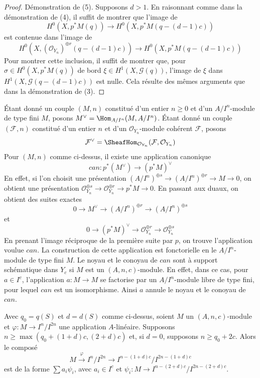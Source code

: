 \begin{proof}
\medskip\noindent
Démonstration de (5). Supposons $d > 1$. En raisonnant comme dans la démonstration de (4), il suffit de montrer que l'image de
$$
H^0(X, p^*M(q))
\longrightarrow
H^0(X, p^*M(q - (d - 1)c))
$$
est contenue dans l'image de
$$
H^0(X, (\mathcal{O}_{Y_n})^{\oplus r}(q - (d - 1)c))
\longrightarrow
H^0(X, p^*M(q - (d - 1)c))
$$
Pour montrer cette inclusion, il suffit de montrer que, pour $\sigma \in H^0(X, p^*M(q))$ de bord $\xi \in H^1(X, \mathcal{G}(q))$, l'image de $\xi$ dans $H^1(X, \mathcal{G}(q - (d - 1)c))$ est nulle. Cela résulte des mêmes arguments que dans la démonstration de (3).
\end{proof}

\begin{remark}
\label{remark-duals}
Étant donné un couple $(M, n)$ constitué d'un entier $n \geq 0$ et d'un $A/I^n$-module de type fini $M$, posons $M^\vee = \Hom_{A/I^n}(M, A/I^n)$. Étant donné un couple $(\mathcal{F}, n)$ constitué d'un entier $n$ et d'un $\mathcal{O}_{Y_n}$-module cohérent $\mathcal{F}$, posons
$$
\mathcal{F}^\vee =
\SheafHom_{\mathcal{O}_{Y_n}}(\mathcal{F}, \mathcal{O}_{Y_n})
$$
Pour $(M, n)$ comme ci-dessus, il existe une application canonique
$$
can : p^*(M^\vee) \longrightarrow (p^*M)^\vee
$$
En effet, si l'on choisit une présentation $(A/I^n)^{\oplus s} \to (A/I^n)^{\oplus r} \to M \to 0$, on obtient une présentation $\mathcal{O}_{Y_n}^{\oplus s} \to \mathcal{O}_{Y_n}^{\oplus r} \to
p^*M \to 0$. En passant aux duaux, on obtient des suites exactes
$$
0 \to M^\vee \to (A/I^n)^{\oplus r} \to (A/I^n)^{\oplus s}
$$
et
$$
0 \to (p^*M)^\vee \to
\mathcal{O}_{Y_n}^{\oplus r} \to
\mathcal{O}_{Y_n}^{\oplus s}
$$
En prenant l'image réciproque de la première suite par $p$, on trouve l'application voulue $can$. La construction de cette application est fonctorielle en le $A/I^n$-module de type fini $M$. Le noyau et le conoyau de $can$ sont à support schématique dans $Y_c$ si $M$ est un $(A, n, c)$-module. En effet, dans ce cas, pour $a \in I^c$, l'application $a : M \to M$ se factorise par un $A/I^n$-module libre de type fini, pour lequel $can$ est un isomorphisme. Ainsi $a$ annule le noyau et le conoyau de $can$.
\end{remark}

\begin{lemma}
\label{lemma-factor-hom}
Avec $q_0 = q(S)$ et $d = d(S)$ comme ci-dessus, soient $M$ un $(A, n, c)$-module et $\varphi : M \to I^n/I^{2n}$ une application $A$-linéaire. Supposons $n \geq \max(q_0 + (1 + d)c, (2 + d)c)$ et, si $d = 0$, supposons $n \geq q_0 + 2c$. Alors le composé
$$
M \xrightarrow{\varphi} I^n/I^{2n} \to
I^{n - (1 + d)c}/I^{2n - (1 + d)c}
$$
est de la forme $\sum a_i \psi_i$, avec $a_i \in I^c$ et $\psi_i : M \to I^{n - (2 + d)c}/I^{2n - (2 + d)c}$.
\end{lemma}

